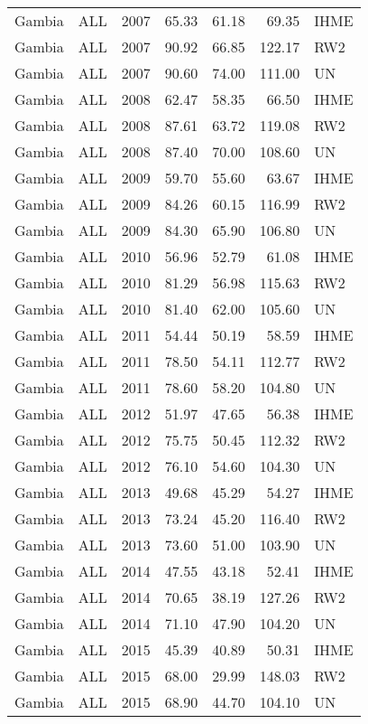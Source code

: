 \begin{longtable}{lllrrrl}
  Gambia & ALL & 2007 & 65.33 & 61.18 & 69.35 & IHME \\ 
  Gambia & ALL & 2007 & 90.92 & 66.85 & 122.17 & RW2 \\ 
  Gambia & ALL & 2007 & 90.60 & 74.00 & 111.00 & UN \\ 
  Gambia & ALL & 2008 & 62.47 & 58.35 & 66.50 & IHME \\ 
  Gambia & ALL & 2008 & 87.61 & 63.72 & 119.08 & RW2 \\ 
  Gambia & ALL & 2008 & 87.40 & 70.00 & 108.60 & UN \\ 
  Gambia & ALL & 2009 & 59.70 & 55.60 & 63.67 & IHME \\ 
  Gambia & ALL & 2009 & 84.26 & 60.15 & 116.99 & RW2 \\ 
  Gambia & ALL & 2009 & 84.30 & 65.90 & 106.80 & UN \\ 
  Gambia & ALL & 2010 & 56.96 & 52.79 & 61.08 & IHME \\ 
  Gambia & ALL & 2010 & 81.29 & 56.98 & 115.63 & RW2 \\ 
  Gambia & ALL & 2010 & 81.40 & 62.00 & 105.60 & UN \\ 
  Gambia & ALL & 2011 & 54.44 & 50.19 & 58.59 & IHME \\ 
  Gambia & ALL & 2011 & 78.50 & 54.11 & 112.77 & RW2 \\ 
  Gambia & ALL & 2011 & 78.60 & 58.20 & 104.80 & UN \\ 
  Gambia & ALL & 2012 & 51.97 & 47.65 & 56.38 & IHME \\ 
  Gambia & ALL & 2012 & 75.75 & 50.45 & 112.32 & RW2 \\ 
  Gambia & ALL & 2012 & 76.10 & 54.60 & 104.30 & UN \\ 
  Gambia & ALL & 2013 & 49.68 & 45.29 & 54.27 & IHME \\ 
  Gambia & ALL & 2013 & 73.24 & 45.20 & 116.40 & RW2 \\ 
  Gambia & ALL & 2013 & 73.60 & 51.00 & 103.90 & UN \\ 
  Gambia & ALL & 2014 & 47.55 & 43.18 & 52.41 & IHME \\ 
  Gambia & ALL & 2014 & 70.65 & 38.19 & 127.26 & RW2 \\ 
  Gambia & ALL & 2014 & 71.10 & 47.90 & 104.20 & UN \\ 
  Gambia & ALL & 2015 & 45.39 & 40.89 & 50.31 & IHME \\ 
  Gambia & ALL & 2015 & 68.00 & 29.99 & 148.03 & RW2 \\ 
  Gambia & ALL & 2015 & 68.90 & 44.70 & 104.10 & UN \\ 

\end{longtable}
